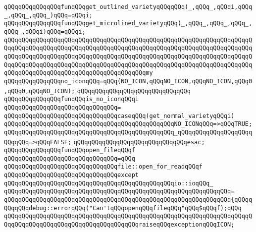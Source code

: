 \verb|qQQqqQQqqQQqqQQqfunqQQqget_outlined_varietyqQQqqQQq(_,qQQq_,qQQqi,qQQq_,qQQq_,qQQq_)qQQq=qQQqi;|\newline
\verb|qQQqqQQqqQQqqQQqfunqQQqget_microlined_varietyqQQq(_,qQQq_,qQQq_,qQQq_,qQQq_,qQQqi)qQQq=qQQqi;|\newline
\verb|qQQqqQQqqQQqqQQqqQQqqQQqqQQqqQQqqQQqqQQqqQQqqQQqqQQqqQQqqQQqqQQqqQQqqQQqqQQqqQQqqQQqqQQqqQQqqQQqqQQqqQQqqQQqqQQqqQQqqQQqqQQqqQQqqQQqqQQqqQQqqQQqqQQqqQQqqQQqqQQqqQQqqQQqqQQqqQQqqQQqqQQqqQQqqQQqqQQqqQQqqQQqqQQqqQQqqQQqqQQqqQQqqQQqqQQqqQQqqQQqqQQqqQQqqQQqqQQqqQQqqQQqqQQqqQQqqQQqqQQqqQQqqQQqqQQqqQQqqQQqqQQqqQQqqQQqqQQqqQQqmy|\newline
\verb|qQQqqQQqqQQqqQQqno_iconqQQq=qQQq(NO_ICON,qQQqNO_ICON,qQQqNO_ICON,qQQq0,qQQq0,qQQqNO_ICON);|\newline
\verb|qQQqqQQqqQQqqQQqqQQqqQQqqQQqqQQq|\newline
\verb|qQQqqQQqqQQqqQQqfunqQQqis_no_iconqQQqi|\newline
\verb|qQQqqQQqqQQqqQQqqQQqqQQqqQQqqQQq=|\newline
\verb|qQQqqQQqqQQqqQQqqQQqqQQqqQQqqQQqcaseqQQq(get_normal_varietyqQQqi)|\newline
\verb|qQQqqQQqqQQqqQQqqQQqqQQqqQQqqQQqqQQqqQQqqQQqqQQqNO_ICONqQQq=>qQQqTRUE;|\newline
\verb|qQQqqQQqqQQqqQQqqQQqqQQqqQQqqQQqqQQqqQQqqQQqqQQq_qQQqqQQqqQQqqQQqqQQqqQQqqQQq=>qQQqFALSE;|\newline
\verb|qQQqqQQqqQQqqQQqqQQqqQQqqQQqqQQqesac;|\newline
\newline
\verb|qQQqqQQqqQQqqQQqfunqQQqopen_fileqQQqf|\newline
\verb|qQQqqQQqqQQqqQQqqQQqqQQqqQQqqQQq=qQQq|\newline
\verb|qQQqqQQqqQQqqQQqqQQqqQQqqQQqqQQqfile::open_for_readqQQqf|\newline
\verb|qQQqqQQqqQQqqQQqqQQqqQQqqQQqqQQqexcept|\newline
\verb|qQQqqQQqqQQqqQQqqQQqqQQqqQQqqQQqqQQqqQQqqQQqqQQqio::ioqQQq_|\newline
\verb|qQQqqQQqqQQqqQQqqQQqqQQqqQQqqQQqqQQqqQQqqQQqqQQqqQQqqQQqqQQqqQQq=|\newline
\verb|qQQqqQQqqQQqqQQqqQQqqQQqqQQqqQQqqQQqqQQqqQQqqQQqqQQqqQQqqQQqqQQq{qQQqqQQqqQQqdebug::errorqQQq("Can'tqQQqopenqQQqfileqQQq"qQQq$qQQqf);qQQq|\newline
\verb|qQQqqQQqqQQqqQQqqQQqqQQqqQQqqQQqqQQqqQQqqQQqqQQqqQQqqQQqqQQqqQQqqQQqqQQqqQQqqQQqqQQqqQQqqQQqqQQqqQQqqQQqqQQqraiseqQQqexceptionqQQqICON;|\newline
